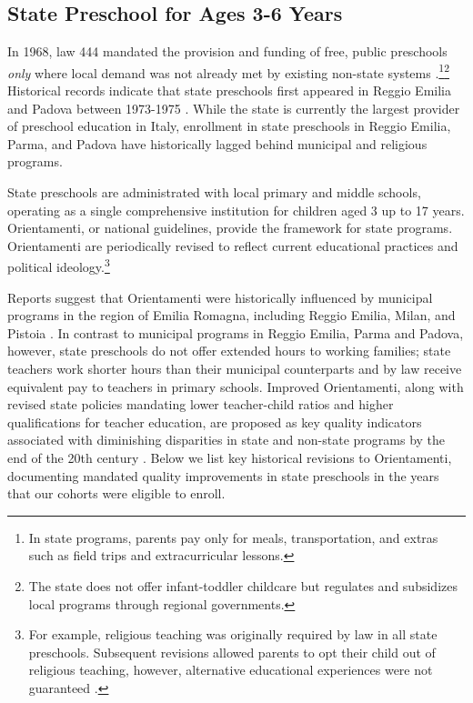 \subsection{State Preschool for Ages 3-6 Years}
In 1968, law 444 mandated the provision and funding of free, public preschools \textit{only} where local demand was not already met by existing non-state systems \citep{Hohnerlein_2009_Paradox-Public-Preschools}.\footnote{In state programs, parents pay only for meals, transportation, and extras such as field trips and extracurricular lessons.}\footnote{The state does not offer infant-toddler childcare but regulates and subsidizes local programs through regional governments.}  Historical records indicate that state preschools first appeared in Reggio Emilia and Padova between 1973-1975 \citep{Padova-Admin-Data_1964-2011,Reggio-Admin-data_1966-2006,Reggio-Annual-Journals_1994-2011}. While the state is currently the largest provider of preschool education in Italy, enrollment in state preschools in Reggio Emilia, Parma, and Padova have historically lagged behind municipal and religious programs.

State preschools are administrated with local primary and middle schools, operating as a single comprehensive institution for children aged 3 up to 17 years. Orientamenti, or national guidelines, provide the framework for state programs. Orientamenti are periodically revised to reflect current educational practices and political ideology.\footnote{For example, religious teaching was originally required by law in all state preschools. Subsequent revisions allowed parents to opt their child out of religious teaching, however, alternative educational experiences were not guaranteed \citep{CEHD_2016_Historical-Analysis}.} 

Reports suggest that Orientamenti were historically influenced by municipal programs in the region of Emilia Romagna, including Reggio Emilia, Milan, and Pistoia \citep{OECD_2001_Italy-Country-Note}. In contrast to municipal programs in Reggio Emilia, Parma and Padova, however, state preschools do not offer extended hours to working families; state teachers work shorter hours than their municipal counterparts and by law receive equivalent pay to teachers in primary schools. Improved Orientamenti, along with revised state policies mandating lower teacher-child ratios and higher qualifications for teacher education, are proposed as key quality indicators associated with diminishing disparities in state and non-state programs by the end of the 20th century \citep{Hohnerlein_2015_Development-and-Diffusion}. Below we list key historical revisions to Orientamenti, documenting mandated quality improvements in state preschools in the years that our cohorts were eligible to enroll.

